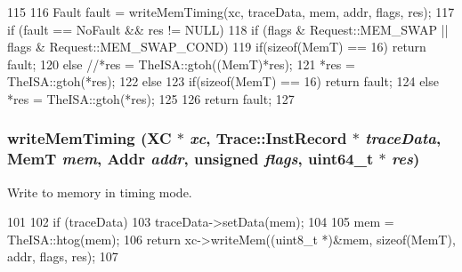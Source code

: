 \begin{DoxyCode}
115 {
116     Fault fault = writeMemTiming(xc, traceData, mem, addr, flags, res);
117     if (fault == NoFault && res != NULL) {
118         if (flags & Request::MEM_SWAP || flags & Request::MEM_SWAP_COND)
119           if(sizeof(MemT) == 16) {return fault;}
120           else {//*res = TheISA::gtoh((MemT)*res);
121                 *res = TheISA::gtoh(*res);}
122         else
123           if(sizeof(MemT) == 16) {return fault;}
124           else{  *res = TheISA::gtoh(*res);}
125     }
126     return fault;
127 }
\end{DoxyCode}
\hypertarget{generic_2memhelpers_8hh_aaef940f518929a90f7b5399c66907fb2}{
\subsubsection[{writeMemTiming}]{ writeMemTiming (XC $\ast$ {\em xc}, \/  {\bf Trace::InstRecord} $\ast$ {\em traceData}, \/  MemT {\em mem}, \/  {\bf Addr} {\em addr}, \/  unsigned {\em flags}, \/  uint64\_\-t $\ast$ {\em res})}}
\label{generic_2memhelpers_8hh_aaef940f518929a90f7b5399c66907fb2}


Write to memory in timing mode. 


\begin{DoxyCode}
101 {
102     if (traceData) {
103         traceData->setData(mem);
104     }
105     mem = TheISA::htog(mem);
106     return xc->writeMem((uint8_t *)&mem, sizeof(MemT), addr, flags, res);
107 }
\end{DoxyCode}
